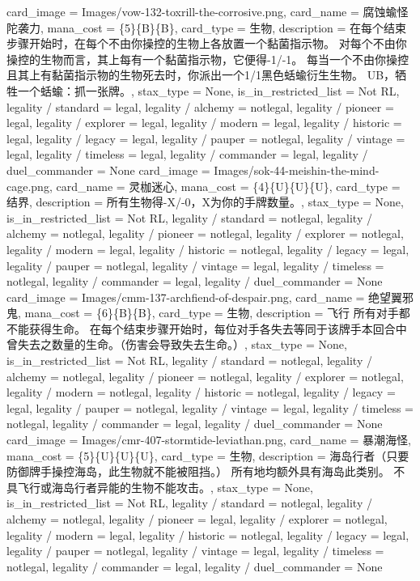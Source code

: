 \documentclass[lang = cn, color = black, 10pt]{AllThatStax}
\begin{document}
\card
{
	card_image = Images/vow-132-toxrill-the-corrosive.png,
	card_name = 腐蚀蝓怪陀袭力,
	mana_cost = \{5\}\{B\}\{B\},
	card_type = 生物,
	description = 在每个结束步骤开始时，在每个不由你操控的生物上各放置一个黏菌指示物。
	对每个不由你操控的生物而言，其上每有一个黏菌指示物，它便得-1/-1。
	每当一个不由你操控且其上有黏菌指示物的生物死去时，你派出一个1/1黑色蛞蝓衍生生物。
	{U}{B}，牺牲一个蛞蝓：抓一张牌。,
	stax_type = None,
	is_in_restricted_list = Not RL,
	legality / standard = legal,
	legality / alchemy = notlegal,
	legality / pioneer = legal,
	legality / explorer = legal,
	legality / modern = legal,
	legality / historic = legal,
	legality / legacy = legal,
	legality / pauper = notlegal,
	legality / vintage = legal,
	legality / timeless = legal,
	legality / commander = legal,
	legality / duel_commander = None
}
\card
{
	card_image = Images/sok-44-meishin-the-mind-cage.png,
	card_name = 灵枷迷心,
	mana_cost = \{4\}\{U\}\{U\}\{U\},
	card_type = 结界,
	description = 所有生物得-X/-0，X为你的手牌数量。,
	stax_type = None,
	is_in_restricted_list = Not RL,
	legality / standard = notlegal,
	legality / alchemy = notlegal,
	legality / pioneer = notlegal,
	legality / explorer = notlegal,
	legality / modern = legal,
	legality / historic = notlegal,
	legality / legacy = legal,
	legality / pauper = notlegal,
	legality / vintage = legal,
	legality / timeless = notlegal,
	legality / commander = legal,
	legality / duel_commander = None
}
\card
{
	card_image = Images/cmm-137-archfiend-of-despair.png,
	card_name = 绝望翼邪鬼,
	mana_cost = \{6\}\{B\}\{B\},
	card_type = 生物,
	description = 飞行
	所有对手都不能获得生命。
	在每个结束步骤开始时，每位对手各失去等同于该牌手本回合中曾失去之数量的生命。（伤害会导致失去生命。）,
	stax_type = None,
	is_in_restricted_list = Not RL,
	legality / standard = notlegal,
	legality / alchemy = notlegal,
	legality / pioneer = notlegal,
	legality / explorer = notlegal,
	legality / modern = notlegal,
	legality / historic = notlegal,
	legality / legacy = legal,
	legality / pauper = notlegal,
	legality / vintage = legal,
	legality / timeless = notlegal,
	legality / commander = legal,
	legality / duel_commander = None
}
\card
{
	card_image = Images/cmr-407-stormtide-leviathan.png,
	card_name = 暴潮海怪,
	mana_cost = \{5\}\{U\}\{U\}\{U\},
	card_type = 生物,
	description = 海岛行者（只要防御牌手操控海岛，此生物就不能被阻挡。）
	所有地均额外具有海岛此类别。
	不具飞行或海岛行者异能的生物不能攻击。,
	stax_type = None,
	is_in_restricted_list = Not RL,
	legality / standard = notlegal,
	legality / alchemy = notlegal,
	legality / pioneer = legal,
	legality / explorer = notlegal,
	legality / modern = legal,
	legality / historic = notlegal,
	legality / legacy = legal,
	legality / pauper = notlegal,
	legality / vintage = legal,
	legality / timeless = notlegal,
	legality / commander = legal,
	legality / duel_commander = None
}
\end{document}

